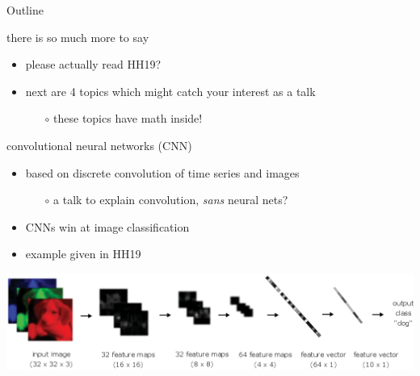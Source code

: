 \documentclass[xcolor={svgnames},
               hyperref={colorlinks,citecolor=DeepPink4,linkcolor=FireBrick,urlcolor=Maroon}]
               {beamer}
\begin{document}
\begin{frame}{Outline}
\end{frame}

\begin{frame}{there is so much more to say}

\begin{itemize}
\item please actually read HH19?
\item next are 4 topics which might catch your interest as a talk
    \begin{itemize}
    \item[$\circ$] these topics have math inside!
    \end{itemize}
\end{itemize}
\end{frame}


\begin{frame}{convolutional neural networks (CNN)}

\begin{itemize}
\item based on discrete convolution of time series and images
    \begin{itemize}
    \item[$\circ$] a talk to explain convolution, \emph{sans} neural nets?
    \end{itemize}
\item CNNs win at image classification
\item example given in HH19
\end{itemize}

\begin{center}
\includegraphics[width=\textwidth]{figs/HH19-cnnimage}
\end{center}
\end{frame}
\end{document}
